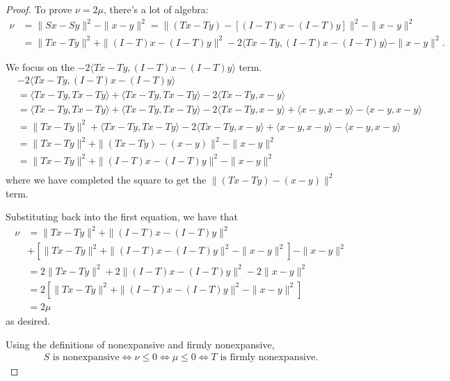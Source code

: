 \documentclass[11pt]{amsart}
\begin{document}
\begin{enumerate}
\begin{enumerate}
\begin{proof}
  To prove $\nu = 2\mu$, there's a lot of algebra:
  \begin{align*}
    \nu &=\|Sx - Sy\|^2 - \|x-y\|^2
    = \|(Tx - Ty) - [(I - T)x - (I - T)y]\|^2  - \|x-y\|^2 \\    
    &= \|Tx - Ty\|^2 + \|(I - T)x - (I - T)y\|^2
      - 2\langle Tx - Ty, (I - T)x - (I - T)y\rangle - \|x-y\|^2.
  \end{align*}

  We focus on the $-2\langle Tx - Ty, (I - T)x - (I - T)y\rangle$ term.
  \begin{align*}
    &-2\langle Tx - Ty, (I - T)x - (I - T)y\rangle \\
    &= \langle Tx - Ty, Tx - Ty \rangle + \langle Tx - Ty, Tx - Ty \rangle
      - 2\langle Tx - Ty, x - y \rangle \\
    &= \langle Tx - Ty, Tx - Ty \rangle + \langle Tx - Ty, Tx - Ty \rangle
      - 2\langle Tx - Ty, x - y \rangle + \langle x - y, x - y \rangle - \langle x - y, x - y \rangle \\
    &= \| Tx - Ty \|^2 + \langle Tx - Ty, Tx - Ty \rangle
      - 2\langle Tx - Ty, x - y \rangle + \langle x - y, x - y \rangle - \langle x - y, x - y \rangle \\
    &= \| Tx - Ty \|^2 + \| (Tx - Ty) - (x-y) \|^2 - \| x - y \|^2 \\
    &= \| Tx - Ty \|^2 + \| (I - T)x - (I- T)y\|^2 - \| x - y \|^2 \\
  \end{align*}
  where we have completed the square to get the $\| (Tx - Ty) - (x-y) \|^2$
  term.

  Substituting back into the first equation, we have that
  \begin{align*}
    \nu
    &= \|Tx - Ty\|^2 + \|(I - T)x - (I - T)y\|^2 \\
    &+ \left[\| Tx - Ty \|^2 + \| (I - T)x - (I- T)y\|^2 - \| x - y \|^2\right] - \|x-y\|^2 \\
    &= 2\|Tx - Ty\|^2 + 2\|(I - T)x - (I - T)y\|^2 - 2\| x - y \|^2 \\
    &= 2\left[\|Tx - Ty\|^2 + \|(I - T)x - (I - T)y\|^2 - \| x - y \|^2\right] \\
    &= 2\mu
  \end{align*}
  as desired.

  Using the definitions of nonexpansive and firmly nonexpansive,
  \begin{align*}
    \text{$S$ is nonexpansive}
    \Leftrightarrow \nu \leq 0
    \Leftrightarrow \mu \leq 0
    \Leftrightarrow \text{$T$ is firmly nonexpansive.}
  \end{align*}
\end{proof}

\end{enumerate}

\end{enumerate}
\end{document}

